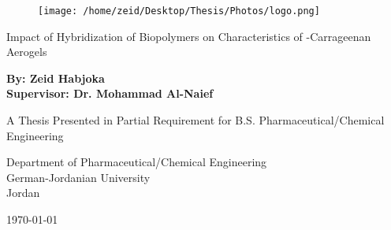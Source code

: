 \documentclass[a4paper,12pt]{article}
\begin{document}

\begin{titlepage} 
  \begin{center}
  
    \vspace*{1 in}
    
    \begin{figure}
       \begin{center}
         \texttt{[image: /home/zeid/Desktop/Thesis/Photos/logo.png]}
         \label{fig0}
       \end{center}
     \end{figure}
    
    \sffamily \Large Impact of Hybridization of Biopolymers on Characteristics of \textkappa-Carrageenan Aerogels \\
    
    \vspace*{1 in} 
    
    \large \textbf{By: Zeid Habjoka} \\
    \large \textbf{Supervisor: Dr. Mohammad Al-Naief} \\
    
    \vspace*{1 in} 
    
    \large A Thesis Presented in Partial Requirement for B.S. Pharmaceutical/Chemical Engineering \\
    
    \vspace*{1 in}
    
    \large Department of Pharmaceutical/Chemical Engineering \\
    \large German-Jordanian University \\
    \large Jordan \\
    
    \vspace*{1 in}
    
    \large \today
    
    \vfill
    
  \end{center}
\end{titlepage}

\pagebreak

\tableofcontents

\pagebreak

\listoffigures

\pagebreak

\listoftables
\end{document}
